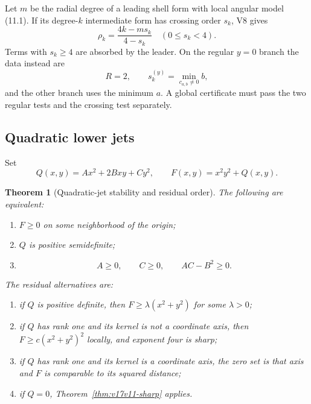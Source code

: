 \documentclass[11pt]{article}
\newtheorem{theorem}{Theorem}[section]
\theoremstyle{remark}
\begin{document}
Let \(m\) be the radial degree of a leading shell form with local
angular model (11.1).  If its degree-\(k\) intermediate form has
crossing order \(s_k\), V8 gives
\[
 \rho_k=\frac{4k-ms_k}{4-s_k}
 \quad(0\leq s_k<4).                               \tag{11.12}
\]
Terms with \(s_k\geq4\) are absorbed by the leader.  On the regular
\(y=0\) branch the data instead are
\[
 R=2,\qquad
 s_k^{(y)}=\min_{c_{a,b}\ne0}b,                    \tag{11.13}
\]
and the other branch uses the minimum \(a\).  A global certificate
must pass the two regular tests and the crossing test separately.

\subsection{Quadratic lower jets}

Set
\[
 Q(x,y)=A x^2+2Bxy+C y^2,\qquad
 F(x,y)=x^2y^2+Q(x,y).                             \tag{11.14}
\]

\begin{theorem}[Quadratic-jet stability and residual order]
\label{thm:v17v11-quadratic}
The following are equivalent:
\begin{enumerate}
\item \(F\geq0\) on some neighborhood of the origin;
\item \(Q\) is positive semidefinite;
\item
\[
 A\geq0,\qquad C\geq0,\qquad AC-B^2\geq0.         \tag{11.15}
\]
\end{enumerate}
The residual alternatives are:
\begin{enumerate}
\item if \(Q\) is positive definite, then
      \(F\geq\lambda(x^2+y^2)\) for some \(\lambda>0\);
\item if \(Q\) has rank one and its kernel is not a coordinate
      axis, then \(F\geq c(x^2+y^2)^2\) locally, and exponent four
      is sharp;
\item if \(Q\) has rank one and its kernel is a coordinate axis,
      the zero set is that axis and \(F\) is comparable to its
      squared distance;
\item if \(Q=0\), Theorem~\ref{thm:v17v11-sharp} applies.
\end{enumerate}
\end{theorem}
\end{document}
